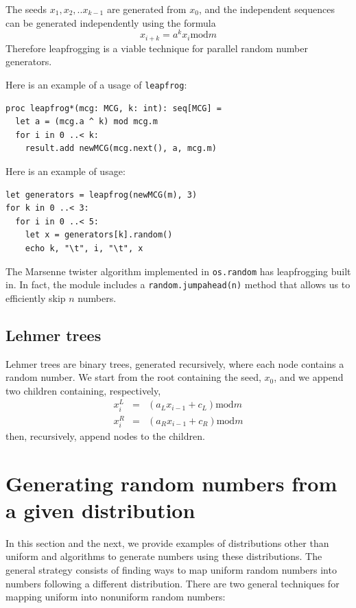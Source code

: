 \documentclass[justified, sixbynine]{tufte-book}
\def\ft{\small\tt}
\theoremstyle{plain}%
\newtheorem * {corollary}{Corollary}
\theoremstyle{definition}
\theoremstyle{remark}
\newtheorem * {remark}{Remark}
\newtheorem * {note}{Note}
\begin{document}
\begin{fullwidth}
The seeds $x_1, x_2, ..x_{k-1}$ are generated from $x_0$, and the independent
sequences can be generated independently using the formula
\begin{equation}
x_{i+k}=a^kx_i\textrm{mod}m
\end{equation}
Therefore leapfrogging is a viable technique for parallel random number
generators.

Here is an example of a usage of {\ft leapfrog}:

\begin{lstlisting}[caption={in file: {\ft nlib.nim}}]
proc leapfrog*(mcg: MCG, k: int): seq[MCG] =
  let a = (mcg.a ^ k) mod mcg.m
  for i in 0 ..< k:
    result.add newMCG(mcg.next(), a, mcg.m)
\end{lstlisting}

Here is an example of usage:
\begin{lstlisting}
let generators = leapfrog(newMCG(m), 3)
for k in 0 ..< 3:
  for i in 0 ..< 5:
    let x = generators[k].random()
    echo k, "\t", i, "\t", x
\end{lstlisting}

The Marsenne twister algorithm implemented in {\ft os.random} has leapfrogging built in. In fact, the module includes a {\ft random.jumpahead(n)} method that allows us to efficiently skip $n$ numbers.

\goodbreak\subsection{Lehmer trees}

Lehmer trees are binary trees, generated recursively, where each node
contains a random number. We start from the root containing the seed, $x_0$, and
we append two children containing, respectively, 
\begin{eqnarray}
x_i^L &=&(a_Lx_{i-1}+c_L)\textrm{mod}m \\
x_i^R &=&(a_Rx_{i-1}+c_R)\textrm{mod}m
\end{eqnarray}
then, recursively, append nodes to the children.

\goodbreak\section{Generating random numbers from a given distribution}


In this section and the next, we provide examples of distributions other than uniform and algorithms to generate numbers using these distributions. The general strategy consists of finding ways to map uniform random numbers into numbers following a different distribution. There are two general techniques for mapping uniform into nonuniform random numbers:


\end{fullwidth}
\end{document}
